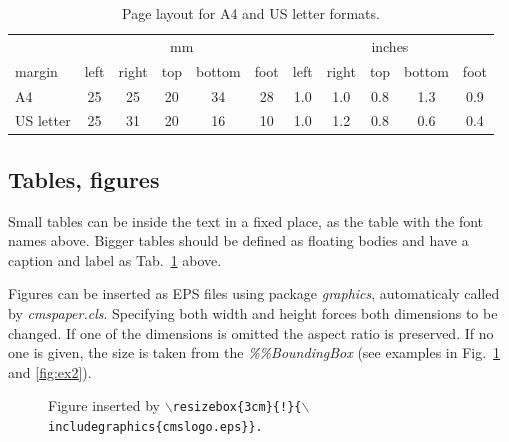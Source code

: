 \documentclass{cmspaper}
\begin{document}
  \begin{table}[htb]
    \caption{Page layout for A4 and US letter formats.}
    \label{tab:page_layout}
    \begin{center}
      \begin{tabular}{|l|ccccc|ccccc|} \hline
               & \multicolumn{5}{c|}{mm} & \multicolumn{5}{c|}{inches} \\ 
        margin & left & right & top & bottom & foot &
                 left & right & top & bottom & foot \\ \hline
        A4 & 25 & 25 & 20 & 34 & 28 & 1.0 & 1.0 & 0.8 & 1.3 & 0.9 \\
        US letter   & 25 & 31 & 20 & 16 & 10 & 1.0 & 1.2 & 0.8 & 0.6 & 0.4 \\ \hline
      \end{tabular}
    \end{center}
  \end{table}

\subsection{Tables, figures}

Small tables can be inside the text in a fixed place, as the table with
the font names above. Bigger tables should be defined as floating bodies
and have a caption and label as Tab.~\ref{tab:page_layout} above.

Figures can be inserted as EPS files using package {\em graphics},
automaticaly called by {\em cmspaper.cls}.
Specifying both width and height forces both dimensions to be changed.
If one of the dimensions is omitted the aspect ratio is preserved.
If no one is given, the size is taken from the {\em \%\%BoundingBox}
(see examples in Fig.~\ref{fig:ex1} and \ref{fig:ex2}).

\begin{figure}[hbtp]
  \begin{center}
    \caption{Figure inserted by 
      \tt $\backslash$resizebox\{3cm\}\{!\}\{$\backslash$includegraphics\{cmslogo.eps\}\}.}
    \label{fig:ex1}
  \end{center}
\end{figure}
\end{document}
